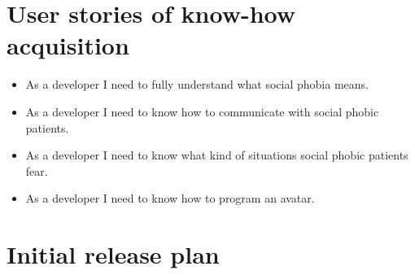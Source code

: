 \section{User stories of know-how acquisition}
\begin{itemize}
\item As a developer I need to fully understand what social phobia means.
\item As a developer I need to know how to communicate with social phobic patients.
\item As a developer I need to know what kind of situations social phobic patients fear.
\item As a developer I need to know how to program an avatar.
\end{itemize}
\section{Initial release plan}